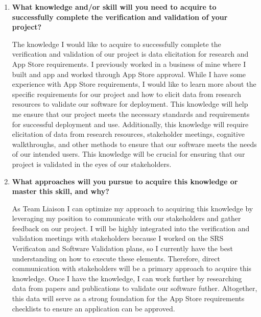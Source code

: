 \documentclass[10pt,titlepage]{article}
\begin{document}
\begin{enumerate}
  I was able to resolve my first pain point by using Claude Opus 5.5 to give me starting lists for the checklists. I did this by passing in the SRS document and VnV Plan 
  Course rubric and then describing my goal. Then after a first draft, I had a goal to achieve and I used it to guide actually generating more specific and meaningful checklists. 
  To solve my second pain point, I communicated with my team about my dilemma and they helped me to decide to send a message in Teams chat and email our TA. Our TA responded to me 
  the morning of the deliverable deadline which was perfect timing! He advised to include at least one article to demonstrate in the template how the validation plan would actually 
  be executed. With this in mind, I found a meta-analysis article and used it to fill out Table \ref{tab:ResearchMapping} and justify how it validated the stakeholder requirements
  STR2.
  \item \textbf{What knowledge and/or skill will you need to acquire to successfully complete the verification and validation of your project?}
  
  The knowledge I would like to acquire to successfully complete the verification and validation of our project is data elicitation for research and App Store requirements. I 
  previously worked in a business of mine where I built and app and worked through App Store approval. While I have some experience with App Store requirements, I would like 
  to learn more about the specific requirements for our project and how to elicit data from research resources to validate our software for deployment. This knowledge will 
  help me ensure that our project meets the necessary standards and requirements for successful deployment and use. Additionally, this knowledge will require elicitation of 
  data from research resources, stakeholder meetings, cognitive walkthroughs, and other methods to ensure that our software meets the needs of our intended users. This 
  knowledge will be crucial for ensuring that our project is validated in the eyes of our stakeholders.

  \item \textbf{What approaches will you pursue to acquire this knowledge or master this skill, and why?}
  
  As Team Liaison I can optimize my approach to acquiring this knowledge by leveraging my position to communicate with our stakeholders and gather feedback on our project.
  I will be highly integrated into the verification and validation meetings with stakeholders because I worked on the SRS Verificaton and Software Validation plans, so I 
  currently have the best understanding on how to execute these elements. Therefore, direct communication with stakeholders will be a primary approach to acquire this knowledge. 
  Once I have the knowledge, I can work further by researching data from papers and publications to validate our software futher. Altogether, this data will serve as a strong 
  foundation for the App Store requirements checklists to ensure an application can be approved.

\end{enumerate}
\end{document}
